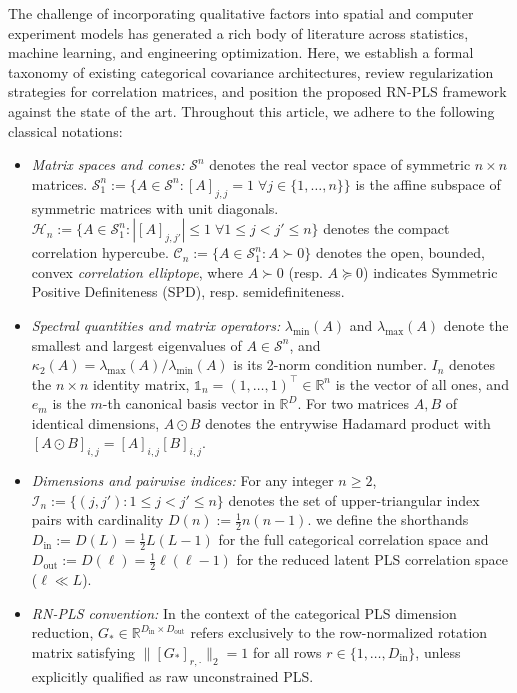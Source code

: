 \documentclass[default,sn-mathphys,Numbered]{sn-jnl}
\theoremstyle{thmstyleone}
\theoremstyle{thmstylethree}
\theoremstyle{thmstyletwo}
\newcommand{\inp}{\text{in}}
\newcommand{\outp}{\text{out}}
\begin{document}
The challenge of incorporating qualitative factors into spatial and computer experiment models has generated a rich body of literature across statistics, machine learning, and engineering optimization. Here, we establish a formal taxonomy of existing categorical covariance architectures, review regularization strategies for correlation matrices, and position the proposed RN-PLS framework against the state of the art.
Throughout this article, we adhere to the following classical notations:
\begin{itemize}
    \item \textit{Matrix spaces and cones:} $\mathcal{S}^n$ denotes the real vector space of symmetric $n \times n$ matrices. $\mathcal{S}_1^n := \{ A \in \mathcal{S}^n : [A]_{j, j} = 1 \; \forall j \in \{1, \ldots, n\} \}$ is the affine subspace of symmetric matrices with unit diagonals. $\mathcal{H}_n := \{ A \in \mathcal{S}_1^n : |[A]_{j, j'}| \le 1 \; \forall 1 \le j < j' \le n \}$ denotes the compact correlation hypercube. $\mathcal{C}_n := \{ A \in \mathcal{S}_1^n : A \succ 0 \}$ denotes the open, bounded, convex \textit{correlation elliptope}, where $A \succ 0$ (resp. $A \succeq 0$) indicates Symmetric Positive Definiteness (SPD), resp. semidefiniteness.
    \item \textit{Spectral quantities and matrix operators:} $\lambda_{\min}(A)$ and $\lambda_{\max}(A)$ denote the smallest and largest eigenvalues of $A \in \mathcal{S}^n$, and $\kappa_2(A) = \lambda_{\max}(A) / \lambda_{\min}(A)$ is its 2-norm condition number. $I_n$ denotes the $n \times n$ identity matrix, $\mathds{1}_n = (1, \ldots, 1)^\top \in \mathbb{R}^n$ is the vector of all ones, and $e_m$ is the $m$-th canonical basis vector in $\mathbb{R}^D$. For two matrices $A, B$ of identical dimensions, $A \odot B$ denotes the entrywise Hadamard product with $[A \odot B]_{i, j} = [A]_{i, j} [B]_{i, j}$.
    \item \textit{Dimensions and pairwise indices:} For any integer $n \ge 2$, $\mathcal{I}_n := \{ (j, j') : 1 \le j < j' \le n \}$ denotes the set of upper-triangular index pairs with cardinality $D(n) := \frac{1}{2}n(n - 1)$. we define the shorthands $D_{\inp} := D(L) = \frac{1}{2}L(L - 1)$ for the full categorical correlation space and $D_{\outp} := D(\ell) = \frac{1}{2}\ell(\ell - 1)$ for the reduced latent PLS correlation space ($\ell \ll L$).
    \item \textit{RN-PLS convention:} In the context of the categorical PLS dimension reduction, $G_* \in \mathbb{R}^{D_{\inp} \times D_{\outp}}$ refers exclusively to the row-normalized rotation matrix satisfying $\|[G_*]_{r, \cdot}\|_2 = 1$ for all rows $r \in \{1, \ldots, D_{\inp}\}$, unless explicitly qualified as raw unconstrained PLS.
\end{itemize}
\end{document}
